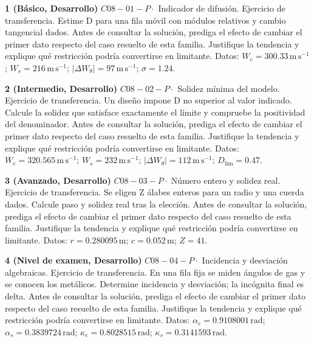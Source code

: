 \documentclass[10pt,openany]{book}
\begin{document}
\begin{tcolorbox}[title={Ejercicios propuestos}, studiumworked, breakable]

\noindent\textbf{1 (Básico, Desarrollo)}
\(C08-01-P \cdot\) Indicador de difusión. Ejercicio de transferencia. Estime D para una fila móvil con módulos relativos y cambio tangencial dados. Antes de consultar la solución, prediga el efecto de cambiar el primer dato respecto del caso resuelto de esta familia. Justifique la tendencia y explique qué restricción podría convertirse en limitante. Datos: \(W_e=300.33\, \mathrm{m}\,\mathrm{s}^{-1}\); \(W_s=216\, \mathrm{m}\,\mathrm{s}^{-1}\); \(|\Delta W_\theta|=97\, \mathrm{m}\,\mathrm{s}^{-1}\); \(\sigma=1.24\).

\noindent\textbf{2 (Intermedio, Desarrollo)}
\(C08-02-P \cdot\) Solidez mínima del modelo. Ejercicio de transferencia. Un diseño impone D no superior al valor indicado. Calcule la solidez que satisface exactamente el límite y compruebe la positividad del denominador. Antes de consultar la solución, prediga el efecto de cambiar el primer dato respecto del caso resuelto de esta familia. Justifique la tendencia y explique qué restricción podría convertirse en limitante. Datos: \(W_e=320.565\, \mathrm{m}\,\mathrm{s}^{-1}\); \(W_s=232\, \mathrm{m}\,\mathrm{s}^{-1}\); \(|\Delta W_\theta|=112\, \mathrm{m}\,\mathrm{s}^{-1}\); \(D_{\mathrm{lim}}=0.47\).

\noindent\textbf{3 (Avanzado, Desarrollo)}
\(C08-03-P \cdot\) Número entero y solidez real. Ejercicio de transferencia. Se eligen Z álabes enteros para un radio y una cuerda dados. Calcule paso y solidez real tras la elección. Antes de consultar la solución, prediga el efecto de cambiar el primer dato respecto del caso resuelto de esta familia. Justifique la tendencia y explique qué restricción podría convertirse en limitante. Datos: \(r=0.280095\, \mathrm{m}\); \(c=0.052\, \mathrm{m}\); \(Z=41\).

\noindent\textbf{4 (Nivel de examen, Desarrollo)}
\(C08-04-P \cdot\) Incidencia y desviación algebraicas. Ejercicio de transferencia. En una fila fija se miden ángulos de gas y se conocen los metálicos. Determine incidencia y desviación; la incógnita final es delta. Antes de consultar la solución, prediga el efecto de cambiar el primer dato respecto del caso resuelto de esta familia. Justifique la tendencia y explique qué restricción podría convertirse en limitante. Datos: \(\alpha_e=0.9108001\, \mathrm{rad}\); \(\alpha_s=0.3839724\, \mathrm{rad}\); \(\kappa_e=0.8028515\, \mathrm{rad}\); \(\kappa_s=0.3141593\, \mathrm{rad}\).
\end{tcolorbox}
\end{document}
